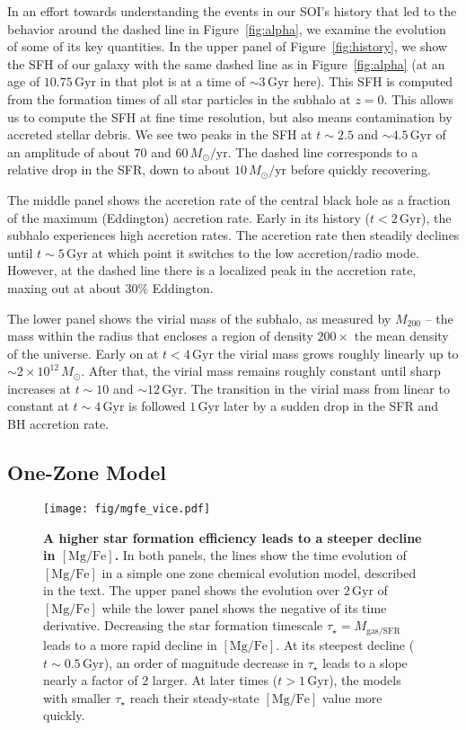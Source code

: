 \documentclass[linenumbers, twocolumn]{aastex631}
\newcommand{\Msun}{\ensuremath{M_{\odot}}}
\newcommand{\Gyr}{\ensuremath{\textrm{Gyr}}}
\newcommand{\MgFe}{\ensuremath{[\textrm{Mg}/\textrm{Fe}]}}
\newcommand{\Msunyr}{\ensuremath{\Msun/\textrm{yr}}}
\begin{document}
In an effort towards understanding the events in our SOI's history that led to the behavior around the dashed line in Figure~\ref{fig:alpha}, we examine the evolution of some of its key quantities. In the upper panel of Figure~\ref{fig:history}, we show the SFH of our galaxy with the same dashed line as in Figure~\ref{fig:alpha} (at an age of $10.75\,\Gyr$ in that plot is at a time of $\sim3\,\Gyr$ here). This SFH is computed from the formation times of all star particles in the subhalo at $z=0$. This allows us to compute the SFH at fine time resolution, but also means contamination by accreted stellar debris. We see two peaks in the SFH at $t\sim2.5$ and $\sim4.5\,\Gyr$ of an amplitude of about $70$ and $60\,\Msunyr$. The dashed line corresponds to a relative drop in the SFR, down to about $10\,\Msunyr$ before quickly recovering.

The middle panel shows the accretion rate of the central black hole as a fraction of the maximum (Eddington) accretion rate. Early in its history ($t<2\,\Gyr$), the subhalo experiences high accretion rates. The accretion rate then steadily declines until $t\sim5\,\Gyr$ at which point it switches to the low accretion/radio mode. However, at the dashed line there is a localized peak in the accretion rate, maxing out at about $30\%$ Eddington.

The lower panel shows the virial mass of the subhalo, as measured by $M_{200}$ -- the mass within the radius that encloses a region of density $200\times$ the mean density of the universe. Early on at $t<4\,\Gyr$ the virial mass grows roughly linearly up to $\sim2\times10^{12}\,\Msun$. After that, the virial mass remains roughly constant until sharp increases at $t\sim10$ and $\sim12\,\Gyr$. The transition in the virial mass from linear to constant at $t\sim4\,\Gyr$ is followed $1\,\Gyr$ later by a sudden drop in the SFR and BH accretion rate.

\subsection{One-Zone Model}\label{ssec:onezone}

\begin{figure}
  \centering
  \texttt{[image: fig/mgfe\_vice.pdf]}
  \caption{\textbf{A higher star formation efficiency leads to a steeper decline in \MgFe{}.} In both panels, the lines show the time evolution of \MgFe{} in a simple one zone chemical evolution model, described in the text. The upper panel shows the evolution over $2\,\Gyr$ of \MgFe{} while the lower panel shows the negative of its time derivative. Decreasing the star formation timescale $\tau_{\star}=M_{\textrm{gas}/\textrm{SFR}}$ leads to a more rapid decline in \MgFe{}. At its steepest decline ($t\sim0.5\,\Gyr$), an order of magnitude decrease in $\tau_{\star}$ leads to a slope nearly a factor of $2$ larger. At later times ($t>1\,\Gyr$), the models with smaller $\tau_{\star}$ reach their steady-state \MgFe{} value more quickly.}
  \label{fig:vice}
\end{figure}
\end{document}

